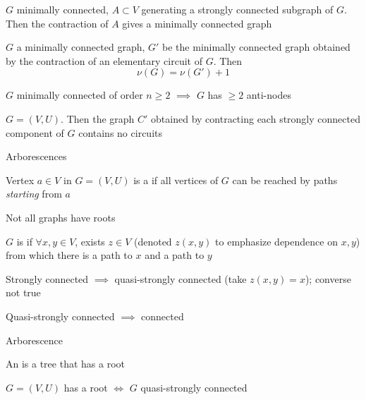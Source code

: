\documentclass[aspectratio=169]{beamer}\usepackage[]{graphicx}\usepackage[]{xcolor}
\begin{document}
\begin{frame}
\begin{theorem}
$G$ minimally connected, $A\subset V$ generating a strongly connected subgraph of $G$. Then the contraction of $A$ gives a minimally connected graph
\end{theorem}
\end{frame}

\begin{frame} 
\begin{theorem}
$G$ a minimally connected graph, $G'$ be the minimally connected graph obtained by the contraction of an elementary circuit of $G$.	Then
\[
\nu(G)=\nu(G')+1
\]
\end{theorem}
\vfill
\begin{theorem}
$G$ minimally connected of order $n\geq 2$ $\implies$ $G$ has $\geq 2$ anti-nodes
\end{theorem}
\vfill
\begin{theorem}
$G=(V,U)$. Then the graph $C'$ obtained by contracting each strongly connected component of $G$ contains no circuits
\end{theorem}
\end{frame}


\begin{frame}{Arborescences}
\begin{definition}[Root]
Vertex $a\in V$ in $G=(V,U)$ is a  if all vertices of $G$ can be reached by paths \emph{starting} from $a$
\end{definition}
Not all graphs have roots
\vfill
\begin{definition}
$G$ is  if $\forall x,y\in V$, exists $z\in V$ (denoted $z(x,y)$ to emphasize dependence on $x,y$) from which there is a path to $x$ and a path to $y$
\end{definition}
Strongly connected $\implies$ quasi-strongly connected (take $z(x,y)=x$); converse not true

Quasi-strongly connected $\implies$ connected
\end{frame}

\begin{frame}{Arborescence}
\begin{definition}[Arborescence]
An  is a tree that has a root
\end{definition}
\vfill
\begin{lemma}
$G=(V,U)$ has a root $\iff$ $G$ quasi-strongly connected
\end{lemma}
\end{frame}
\end{document}
